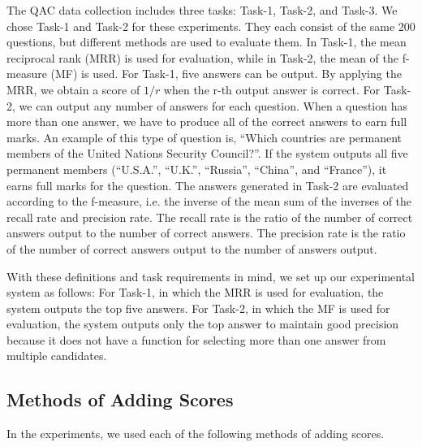 The QAC data collection includes three tasks: Task-1, Task-2, and Task-3. 
We chose Task-1 and Task-2 for these experiments. 
They each consist of the same 200 questions, but 
different methods are used to evaluate them. 
In Task-1, the mean reciprocal rank (MRR) is used for evaluation, while 
in Task-2, the mean of the f-measure (MF) is used. 
For Task-1, five answers can be output.
By applying the MRR, we obtain a score of $1/r$ when the r-th output answer is correct. 
For Task-2, we can output any number of answers for each question. 
When a question has more than one 
answer, we have to produce all of the correct answers to earn full marks.
An example of this type of question is, ``Which countries are permanent members of the United Nations Security Council?''. 
If the system outputs all five permanent members (``U.S.A.'', ``U.K.'', ``Russia'', ``China'', and ``France''), 
it earns full marks for the question. 
The answers generated in Task-2 are evaluated according to the f-measure, i.e. the inverse of the mean sum of 
the inverses of the recall rate and precision rate. 
The recall rate is the ratio of the number of correct answers 
output to the number of correct answers. The precision rate is the ratio of the 
number of correct answers output to the number of answers output. 

With these definitions and task requirements in mind, 
we set up our experimental system as follows: 
For Task-1, in which the MRR is 
used for evaluation, the system outputs the top five answers.
For Task-2, in which the MF is used for
evaluation, the system outputs only the top answer 
to maintain good precision 
because it does not have a function for selecting more than one answer 
from multiple candidates. 

\subsection{Methods of Adding Scores}
\label{sec:adding_scores}

In the experiments, we used each of the following methods 
of adding scores. 

